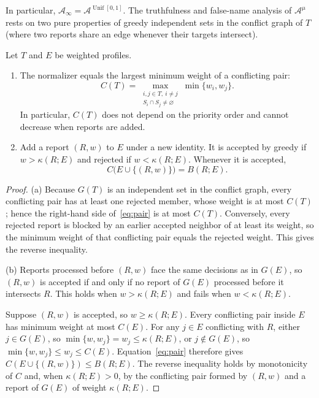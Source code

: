 \documentclass[format=acmsmall, review=false]{acmart}
\theoremstyle{acmdefinition}%
\begin{document}
In particular, \(\mathcal A_\infty=\mathcal A^{\operatorname{Unif}[0,1]}\).
The truthfulness and false-name analysis of \(\mathcal A^{\mu}\)
rests on two pure properties of greedy independent sets in the
conflict graph of \(T\) (where two reports share an edge whenever
their targets intersect).

\begin{lemma}
\label{lem:greedy}
Let \(T\) and \(E\) be weighted profiles.
\begin{enumerate}
\item[(a)] The normalizer equals the largest minimum weight of a
conflicting pair:
\begin{equation}\label{eq:pair}
C(T)=
\max_{\substack{i,j\in T,\ i\ne j\\
                 S_i\cap S_j\ne\varnothing}}
\min\{w_i,w_j\}.
\end{equation}
In particular, \(C(T)\) does not depend on the priority order and
cannot decrease when reports are added.
\item[(b)] Add a report \((R,w)\) to \(E\) under a new identity.
It is accepted by greedy if \(w>\kappa(R;E)\) and rejected if
\(w<\kappa(R;E)\). Whenever it is accepted,
\begin{equation}\label{eq:normalizer}
C\bigl(E\cup\{(R,w)\}\bigr)=B(R;E).
\end{equation}
\end{enumerate}
\end{lemma}

\begin{proof}
(a) Because \(G(T)\) is an independent set in the conflict graph,
every conflicting pair has at least one rejected member, whose
weight is at most \(C(T)\); hence the right-hand side
of~\eqref{eq:pair} is at most \(C(T)\). Conversely, every rejected
report is blocked by an earlier accepted neighbor of at least its
weight, so the minimum weight of that conflicting pair equals the
rejected weight. This gives the reverse inequality.

(b) Reports processed before \((R,w)\) face the same decisions as
in \(G(E)\), so \((R,w)\) is accepted if and only if no report of
\(G(E)\) processed before it intersects \(R\). This holds when
\(w>\kappa(R;E)\) and fails when \(w<\kappa(R;E)\).

Suppose \((R,w)\) is accepted, so \(w\ge\kappa(R;E)\). Every
conflicting pair inside \(E\) has minimum weight at most \(C(E)\).
For any \(j\in E\) conflicting with \(R\), either \(j\in G(E)\),
so \(\min\{w,w_j\}=w_j\le\kappa(R;E)\), or \(j\notin G(E)\), so
\(\min\{w,w_j\}\le w_j\le C(E)\). Equation~\eqref{eq:pair}
therefore gives \(C(E\cup\{(R,w)\})\le B(R;E)\). The reverse
inequality holds by monotonicity of \(C\) and, when
\(\kappa(R;E)>0\), by the conflicting pair formed by \((R,w)\) and
a report of \(G(E)\) of weight \(\kappa(R;E)\).
\end{proof}
\end{document}
